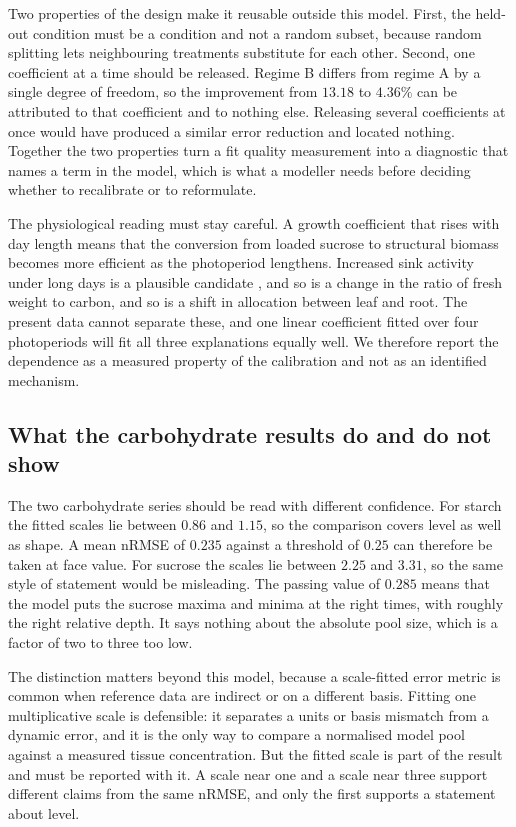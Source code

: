 Two properties of the design make it reusable outside this model. First, the
held-out condition must be a condition and not a random subset, because random
splitting lets neighbouring treatments substitute for each other. Second, one
coefficient at a time should be released. Regime B differs from regime A by a
single degree of freedom, so the improvement from $13.18$ to $4.36\%$ can be
attributed to that coefficient and to nothing else. Releasing several
coefficients at once would have produced a similar error reduction and located
nothing. Together the two properties turn a fit quality measurement into a
diagnostic that names a term in the model, which is what a modeller needs before
deciding whether to recalibrate or to reformulate.

The physiological reading must stay careful. A growth coefficient that rises
with day length means that the conversion from loaded sucrose to structural
biomass becomes more efficient as the photoperiod lengthens. Increased sink
activity under long days is a plausible candidate \citep{Smith2007,Sulpice2014},
and so is a change in the ratio of fresh weight to carbon, and so is a shift in
allocation between leaf and root. The present data cannot separate these, and
one linear coefficient fitted over four photoperiods will fit all three
explanations equally well. We therefore report the dependence as a measured
property of the calibration and not as an identified mechanism.

\subsection{What the carbohydrate results do and do not show}

The two carbohydrate series should be read with different confidence. For starch
the fitted scales lie between $0.86$ and $1.15$, so the comparison covers level
as well as shape. A mean nRMSE of $0.235$ against a threshold of $0.25$ can
therefore be taken at face value. For sucrose the scales lie between $2.25$ and $3.31$, so
the same style of statement would be misleading. The passing value of $0.285$
means that the model puts the sucrose maxima and minima at the right times, with
roughly the right relative depth. It says nothing about the absolute pool size,
which is a factor of two to three too low.

The distinction matters beyond this model, because a scale-fitted error metric
is common when reference data are indirect or on a different basis. Fitting one
multiplicative scale is defensible: it separates a units or basis mismatch from a
dynamic error, and it is the only way to compare a normalised model pool against
a measured tissue concentration. But the fitted scale is part of the result and
must be reported with it. A scale near one and a scale near three support
different claims from the same nRMSE, and only the first supports a statement
about level.

